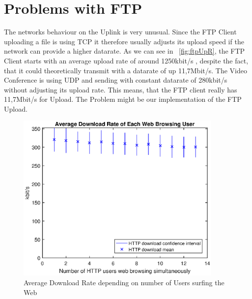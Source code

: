 \documentclass[a4paper,10pt]{book}\usepackage{graphicx}
\begin{document}
\section{Problems with FTP}
The networks behaviour on the Uplink is very unusual. Since the FTP Client uploading a file is using TCP it therefore usually adjusts its upload speed if the network can provide a higher datarate.
As we can see in ~\ref{fig:ftpUpR}, the FTP Client starts with an average upload rate of around 1250kbit/s , despite the fact, that it could theoretically transmit with a datarate of up  11,7Mbit/s.
The Video Conference is using UDP and sending with constant datarate of 280kbit/s without adjusting its upload rate. This means, that the FTP client really has 11,7Mbit/s for Upload.
The Problem might be our implementation of the FTP Upload. 

\begin{figure}[!ht]
  \begin{center}
    \includegraphics[width=0.9\textwidth]{off_http_download.eps}
    \caption{Average Download Rate depending on number of Users surfing the Web}
    \label{fig:httpDR}
  \end{center}
\end{figure}
\end{document}

